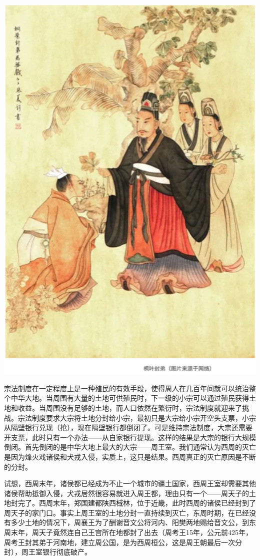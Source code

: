 \documentclass[]{book}
\begin{document}
\includegraphics[width=5.67in]{images/gx3}

宗法制度在一定程度上是一种殖民的有效手段，使得周人在几百年间就可以统治整个中华大地。当周围有大量的土地可供殖民时，下一级的小宗可以通过殖民获得土地和收益。当周围没有足够的土地，而人口依然在繁衍时，宗法制度就迎来了挑战。宗法制度要求大宗将土地分封给小宗，最初只是大宗给小宗开空头支票，小宗从隔壁银行兑现（抢），现在隔壁银行都倒闭了。可是维持宗法制度，大宗还需要开支票，此时只有一个办法------从自家银行提现。这样的结果是大宗的银行大规模倒闭。首先倒闭的是中华大地上最大的大宗------周王室。我们通常认为西周的灭亡是因为烽火戏诸侯和犬戎入侵，实质上，这只是结果。西周真正的灭亡原因是不断的分封。

试想，西周末年，诸侯都已经成为不止一个城市的疆土国家，西周王室却需要其他诸侯帮助抵御入侵，犬戎居然很容易就进入周王都，理由只有一个------周天子的土地封完了。西周末年，郑国建都陕西棫林，位于近畿，此时西周的诸侯已经封到了周天子的家门口。事实上周王室的土地分封一直持续到灭亡，东周时期，在已经没有多少土地的情况下，周襄王为了酬谢晋文公将河内、阳樊两地赐给晋文公，到东周末年，周天子竟然连自己王宫所在地都封了出去（周考王15年，公元前425年，周考王封其弟于河南地，建立周公国，是为西周桓公，这是周王朝最后一次分封），周王室银行彻底破产。
\end{document}
